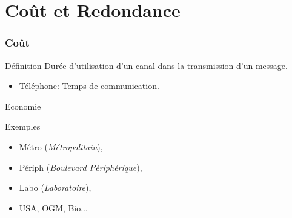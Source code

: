 \section{Coût et Redondance}

\begin{frame}
	\frametitle{Coût}
	\begin{block}{Définition}
		Durée d'utilisation d'un canal dans la transmission d'un message.
		\begin{itemize}
			\item Téléphone: Temps de communication.
		\end{itemize}
	\end{block}
	\begin{alertblock}{Economie}
		\centering
	\end{alertblock}
	\begin{exampleblock}{Exemples}
		\begin{itemize}
			\item Métro (\emph{Métropolitain}),
			\item Périph (\emph{Boulevard Périphérique}),
			\item Labo (\emph{Laboratoire}),
			\item USA, OGM, Bio...
		\end{itemize}
	\end{exampleblock}
\end{frame}

